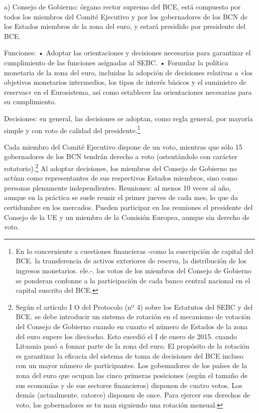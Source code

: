 \documentclass[10pt,a4paper]{article}
\begin{document}
{a) Consejo de Gobierno: órgano rector supremo del BCE, está compuesto por todos los miembros del Comité Ejecutivo y por los gobernadores de los BCN de los Estados miembros de la zona del euro, y estará presidido por presidente del BCE.

Funciones:
• Adoptar las orientaciones y decisiones necesarias para garantizar el cumplimiento de las funciones asignadas al SEBC. • Formular la política monetaria de la zona del euro, incluidas la adopción de decisiones relativas a «los objetivos monetarios intermedios, los tipos de interés básicos y el suministro de reservas» en el Eurosistema, así como establecer las orientaciones necesarias para su cumplimiento. 

Decisiones: en general, las decisiones se adoptan, como regla general, por mayoría simple y con voto de calidad del presidente.\footnote{%
    En lo concerniente a cuestiones financieras -como la suscripción de capital del BCE. la transferencia de activos exteriores de reserva, la distribución de los ingresos monetarios. ele.-. los votos de los miembros del Consejo de Gobierno se ponderan confonne a la participación de cada banco central nacional en el capital suscrito del BCE.
} 

Cada miembro del Comité Ejecutivo dispone de un voto, mientras que sólo 15 gobernadores de los BCN tendrán derecho a voto (ostentándolo con carácter rotatorio).\footnote{%
    Según el artículo I O del Protocolo (nº 4) sobre los Estatutos del SEBC y del BCE. se debe introducir un sistema de rotación en el mecanismo de votación del Consejo de Gobierno cuando en cuanto el número de Estados de la zona del euro supere los dieciocho. Esto sucedió el I de enero de 2015. cuando Lituania pasó a fonnar parte de la zona del euro. El propósito de la rotación es garantizar la eficacia del sistema de toma de decisiones del BCE incluso con un mayor número de participantes. Los gobemadores de los países de la zona del euro que ocupan las cinco primeras posiciones (según el tamaño de sus economías y de sus sectores financieros) disponen de cuatro votos. Los demás (actualmente. catorce) disponen de once. Para ejercer sus derechos de voto, los gobernadores se tu man siguiendo una rotación mensual.
} Al adoptar decisiones, los miembros del Consejo de Gobierno no actúan como representantes de sus respectivos Estados miembros, sino como personas plenamente independientes. 
Reuniones: al menos 10 veces al año, aunque en la práctica se suele reunir el primer jueves de cada mes, lo que da certidumbre en los mercados. Pueden participar en las reuniones el presidente del Consejo de la UE y un miembro de la Comisión Europea, aunque sin derecho de voto.

}
\end{document}
